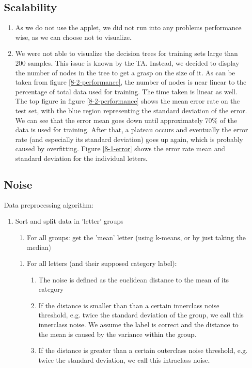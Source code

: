 \documentclass[	DIV=calc,%
				paper=a4,%
				fontsize=11pt,%
				twocolumn]{scrartcl}	 %
\begin{document}
\subsection{Scalability}

\begin{enumerate}
	\item As we do not use the applet, we did not run into any problems performance wise, as we can choose not to visualize.
	\item We were not able to visualize the decision trees for training sets large than 200 samples. This issue is known by the TA. Instead, we decided to display the number of nodes in the tree to get a grasp on the size of it. As can be taken from figure \ref{8-2-performance}, the number of nodes is near linear to the percentage of total data used for training. The time taken is linear as well. The top figure in figure \ref{8-2-performance} shows the mean error rate on the test set, with the blue region representing the standard deviation of the error. We can see that the error mean goes down until approximately 70\% of the data is used for training. After that, a plateau occurs and eventually the error rate (and especially its standard deviation) goes up again, which is probably caused by overfitting.
	 Figure \ref{8-1-error} shows the error rate mean and standard deviation for the individual letters. 
\end{enumerate}

\subsection{Noise}

Data preprocessing algorithm:
\begin{enumerate}
	\item Sort and split data in 'letter' groups
		\begin{enumerate}
		\item For all groups: get the 'mean' letter (using k-means, or by just taking the median)	
		\end{enumerate}
		\begin{enumerate}
		\item For all letters (and their supposed category label):
			\begin{enumerate}
			\item The noise is defined as the euclidean distance to the mean of its category
			\item If the distance is smaller than than a certain innerclass noise threshold, e.g. twice the standard deviation of the group, we call this innerclass noise. We assume the label is correct and the distance to the mean is caused by the variance within the group.
			\item If the distance is greater than a certain outerclass noise threshold, e.g. twice the standard deviation, we call this intraclass noise.
			\end{enumerate}
		\end{enumerate}
\end{enumerate}
\end{document}

